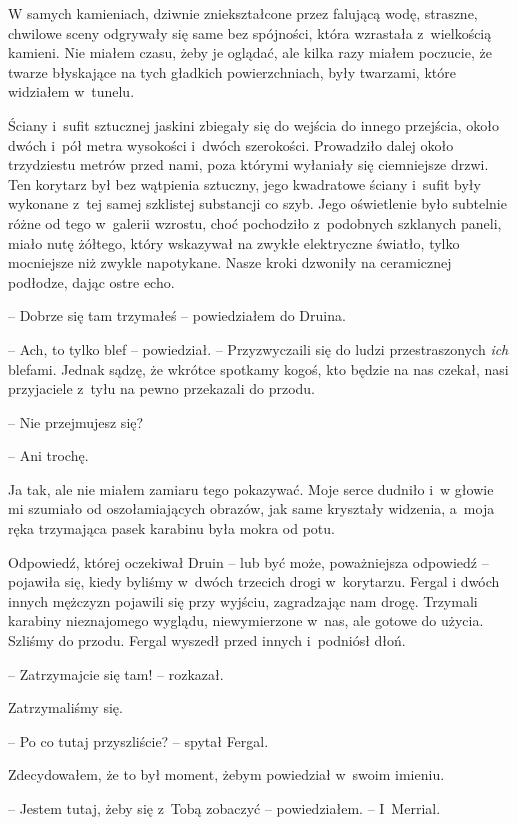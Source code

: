 \documentclass[oneside,polish,11pt,sfheadings]{mwbk}
\begin{document}
W samych kamieniach, dziwnie zniekształcone przez falującą wodę,
straszne, chwilowe sceny odgrywały się same bez spójności, która
wzrastała z~wielkością kamieni. Nie miałem czasu, żeby je oglądać, ale
kilka razy miałem poczucie, że twarze błyskające na tych gładkich
powierzchniach, były twarzami, które widziałem w~tunelu.

Ściany i~sufit sztucznej jaskini zbiegały się do wejścia do innego
przejścia, około dwóch i~pół metra wysokości i~dwóch szerokości.
Prowadziło dalej około trzydziestu metrów przed nami, poza którymi
wyłaniały się ciemniejsze drzwi. Ten korytarz był bez wątpienia
sztuczny, jego kwadratowe ściany i~sufit były wykonane z~tej samej
szklistej substancji co szyb. Jego oświetlenie było subtelnie różne od
tego w~galerii wzrostu, choć pochodziło z~podobnych szklanych paneli,
miało nutę żółtego, który wskazywał na zwykłe elektryczne światło, tylko
mocniejsze niż zwykle napotykane. Nasze kroki dzwoniły na ceramicznej
podłodze, dając ostre echo.

-- Dobrze się tam trzymałeś -- powiedziałem do Druina.

-- Ach, to tylko blef -- powiedział. -- Przyzwyczaili się do ludzi
przestraszonych \textit{ich} blefami. Jednak sądzę, że wkrótce spotkamy
kogoś, kto będzie na nas czekał, nasi przyjaciele z~tyłu na pewno
przekazali do przodu.

-- Nie przejmujesz się?

-- Ani trochę.

Ja tak, ale nie miałem zamiaru tego pokazywać. Moje serce dudniło i~w głowie mi szumiało od oszołamiających obrazów, jak same kryształy
widzenia, a~moja ręka trzymająca pasek karabinu była mokra od potu.

Odpowiedź, której oczekiwał Druin -- lub być może, poważniejsza odpowiedź
-- pojawiła się, kiedy byliśmy w~dwóch trzecich drogi w~korytarzu. Fergal
i dwóch innych mężczyzn pojawili się przy wyjściu, zagradzając nam
drogę. Trzymali karabiny nieznajomego wyglądu, niewymierzone w~nas, ale
gotowe do użycia. Szliśmy do przodu. Fergal wyszedł przed innych i~podniósł dłoń.

-- Zatrzymajcie się tam! -- rozkazał.

Zatrzymaliśmy się.

-- Po co tutaj przyszliście? -- spytał Fergal.

Zdecydowałem, że to był moment, żebym powiedział w~swoim imieniu.

-- Jestem tutaj, żeby się z~Tobą zobaczyć -- powiedziałem. -- I~Merrial.
\end{document}
